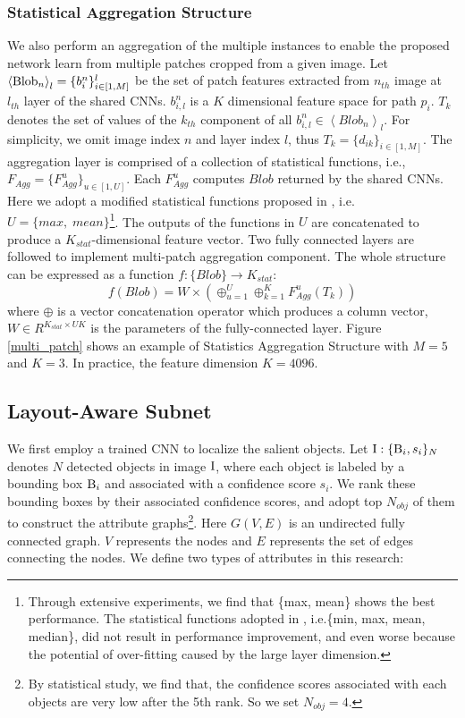 \documentclass[10pt,twocolumn,letterpaper]{article}
\begin{document}
\subsubsection{Statistical Aggregation Structure}
We also perform an aggregation of the multiple instances to enable the proposed network learn from multiple patches cropped from a given image. Let ${\left\langle {{\rm{Blo}}{{\rm{b}}_n}} \right\rangle _{l}} = \{ b_i^n\} _{i \in [1,M]}^{l}$ be the set of patch features extracted from $n_{th}$ image 
at $l_{th}$ layer of the shared CNNs. $b_{i,l}^n$ is a $K$ dimensional feature space for path $p_i$.
$T_k$ denotes the set of values of the $k_{th}$ component of all $b_{i,l}^n \in {\left\langle {Blo{b_n}} \right\rangle _l}$. For simplicity, we omit image index $n$ and layer index $l$, thus ${T_k} = {\{ {d_{ik}}\} _{i \in [1,M]}}$.
The aggregation layer is comprised of a collection of statistical functions, 
i.e., ${F_{Agg}} = {\{ F_{Agg}^u\} _{u \in [1,U]}}$. Each $F_{Agg}^u$ computes
$Blob$ returned by the shared CNNs. Here we adopt a modified statistical functions proposed in \cite{Lu:2015:ICCV}, i.e. $U = \{ max,\;mean\} $\footnote[1]{Through extensive experiments, we find that \{max, mean\} shows the best performance. The statistical functions adopted in \cite{Lu:2015:ICCV}, i.e.\{min, max, mean, median\}, did not result in performance improvement, and even worse because the potential of over-fitting caused by the large layer dimension.}. The outputs of the functions in $U$ are concatenated to produce a ${K_{stat}}$-dimensional feature vector. Two fully connected layers are followed to implement multi-patch
aggregation component. The whole structure can be expressed as a function 
$f:\{ Blob\}  \to {{{K_{stat}}}}$:
\begin{equation}
f(Blob) = W \times ( \oplus _{u = 1}^U \oplus _{k = 1}^KF_{Agg}^u({T_k}))
\end{equation}
where $ \oplus$ is a vector concatenation operator which produces a column vector, $W \in {R^{{K_{stat}} \times UK}}$ is the parameters of the fully-connected layer. 
Figure \ref{multi_patch} shows an example of Statistics Aggregation Structure with $M = 5$ and $K=3$. In practice, the feature dimension $K=4096$.

\subsection{Layout-Aware Subnet}
We first employ a trained CNN  \cite{zhang:2015:CVPR:boundingbox} to localize the salient objects. Let ${\rm I}:{\{ {{\rm B}_i},{s_i}\} _{{N}}}$ denotes $N$ detected objects in image ${\rm I}$, where each object is labeled by a bounding box ${{\rm B}_i}$ and associated with a confidence score ${s_i}$. We rank these bounding boxes by their associated confidence scores, and adopt top $N_{obj}$ of them to construct the attribute graphs\footnote[2]{By statistical study, we find that, the confidence scores associated with each objects are very low after the 5{\tiny th} rank. So we set $N_{obj} = 4$.}.
Here $G(V,E)$ is an undirected fully connected graph. 
$V$ represents the nodes and $E$ represents the set of edges connecting the nodes. We define two types of attributes in this research:
\end{document}
